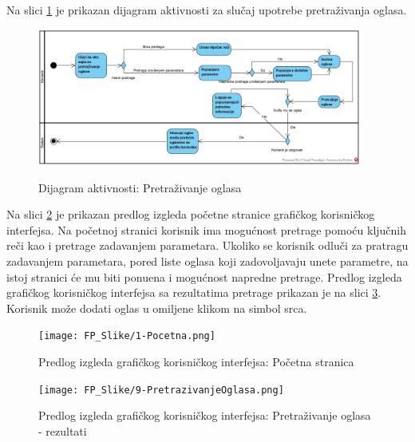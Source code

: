 \documentclass[20pt]{article}
\begin{document}
\setlength{\parindent}{1cm}
\fontsize{13}{18} \selectfont 

Na slici \ref{fig:dijagramAktivnostiPretrazivanjeOglasa} je prikazan dijagram aktivnosti za slu\v{c}aj upotrebe pretra\v {z}ivanja oglasa.

\begin{figure}[h]
        \centering
        \includegraphics[width=0.95\textwidth,height=0.49\textheight]{Pictures/PretrazivanjeOglasa}\\
        \caption{Dijagram aktivnosti: Pretra\v {z}ivanje oglasa}
        \label{fig:dijagramAktivnostiPretrazivanjeOglasa}
    \end{figure}

\newpage
{}
\setlength{\parindent}{1cm}
\fontsize{13}{18} \selectfont 
Na slici \ref{fig:guiPretrazivanjeOglasa} je prikazan predlog izgleda po\v cetne stranice grafi\v ckog korisni\v ckog interfejsa. Na po\v cetnoj stranici korisnik ima mogu\' cnost pretrage pomo\' cu klju\v cnih re\v ci kao i pretrage zadavanjem parametara. Ukoliko se korisnik odlu\v ci za pratragu zadavanjem parametara, pored liste oglasa koji zadovoljavaju unete parametre, na istoj stranici \' ce mu biti ponu\dj ena i mogu\' cnost napredne pretrage. Predlog izgleda grafi\v ckog korisni\v ckog interfejsa sa rezultatima pretrage prikazan je na slici \ref{fig:guiPretrazivanjeOglasaRez}. Korisnik mo\v ze dodati oglas u omiljene klikom na simbol srca.

\begin{figure}[h]
        \centering
        \texttt{[image: FP\_Slike/1-Pocetna.png]}\\
        \caption{Predlog izgleda grafi\v ckog korisni\v ckog interfejsa: Po\v cetna stranica}
        \label{fig:guiPretrazivanjeOglasa}
    \end{figure}

\newpage
\begin{figure}[h]
        \centering
        \texttt{[image: FP\_Slike/9-PretrazivanjeOglasa.png]}\\
        \caption{Predlog izgleda grafi\v ckog korisni\v ckog interfejsa: Pretra\v zivanje oglasa - rezultati}
        \label{fig:guiPretrazivanjeOglasaRez}
    \end{figure}
\end{document}
